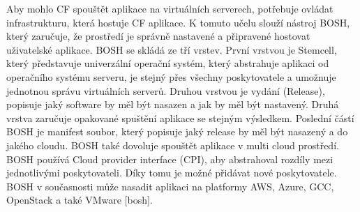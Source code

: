     Aby mohlo CF spouštět aplikace na virtuálních serverech, potřebuje ovládat infrastrukturu, která hostuje CF aplikace. K tomuto učelu slouží nástroj BOSH, který zaručuje, že prostředí je správně nastavené a připravené hostovat uživatelské aplikace. BOSH se skládá ze tří vrstev. První vrstvou je Stemcell, který představuje univerzální operační systém, který abstrahuje aplikaci od operačního systému serveru, je stejný přes všechny poskytovatele a umožnuje jednotnou správu virtuálních serverů. Druhou vrstvou je vydání (Release), popisuje jaký software by měl být nasazen a jak by měl být nastavený. Druhá vrstva zaručuje opakované spuštění aplikace se stejným výsledkem. Poslední částí BOSH je 
    manifest soubor, který popisuje jaký release by měl být nasazený a do jakého cloudu. BOSH také dovoluje spouštět aplikace v multi cloud prostředí. BOSH používá Cloud provider interface (CPI), aby abstrahoval rozdíly mezi jednotlivými poskytovateli. Díky tomu je možné přidávat nové poskytovatele. BOSH v současnosti může nasadit aplikaci na platformy AWS, Azure, GCC, OpenStack a také VMware [bosh].

